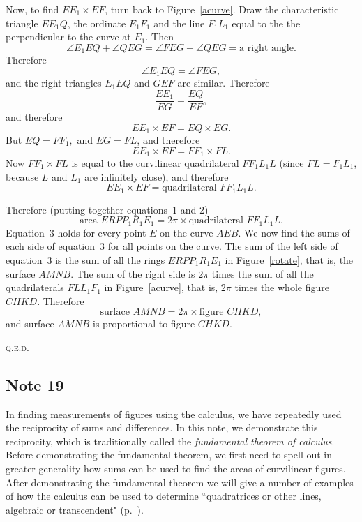 \documentclass[twoside,openright]{article}
\begin{document}
Now, to find $EE_1 \times EF$, turn back to Figure~\ref{acurve}. 
Draw
the characteristic triangle $EE_1Q$, the ordinate $E_1F_1$ and the
line $F_1L_1$ equal to the the perpendicular to the curve at $E_1$.
Then %
$$\angle E_1EQ + \angle QEG  = \angle FEG + \angle QEG = \mbox{a right angle.}$$
Therefore
$$\angle E_1EQ = \angle FEG,$$
and the right triangles $E_1EQ$ and $GEF$ are similar.  Therefore
$$\frac{EE_1}{EG} = \frac{EQ}{EF},$$
and therefore
$$EE_1\times EF = EQ \times EG.$$
But $EQ = FF_1,$ and $EG = FL$, and therefore
$$EE_1\times EF = FF_1 \times FL.$$
Now
$FF_1 \times FL$ is equal to the  curvilinear quadrilateral $FF_1L_1L$
(since $FL = F_1L_1$, because $L$ and $L_1$ are infinitely close), and therefore
\begin{equation}
EE_1\times EF = \mbox{quadrilateral }FF_1L_1L.
\end{equation}


Therefore (putting together equations~1 and 2)
\begin{equation}
\mbox{area }ERPP_1R_1E_1 = 2\pi\times \mbox{quadrilateral }FF_1L_1L.
\end{equation}
Equation~3 holds for every point $E$ on the curve $AEB$. We now find
the sums of each side of equation~3 for all points on the curve.  The
sum of the left side of equation~3 is the sum of all the rings
$ERPP_1R_1E_1$ in Figure~\ref{rotate}, that is, the surface $AMNB$.
The sum of the right side is $2\pi$ times the sum of all the
quadrilaterals $FLL_1F_1$ in Figure~\ref{acurve}, that is, $2\pi$
times the whole figure $CHKD$.  Therefore
$$\mbox{surface }AMNB = 2\pi\times \mbox{figure }CHKD,$$
and surface $AMNB$ is proportional to figure $CHKD$.

\noindent  \textsc{q.e.d.}

\subsection*{Note 19}
\label{crg19}

In finding measurements of figures using the calculus, we have
repeatedly used the reciprocity of sums and differences.  In this
note, we demonstrate this reciprocity, which is traditionally called
the {\em fundamental theorem of calculus}.  Before demonstrating the
fundamental theorem, we first need to spell out in greater generality
how sums can be used to find the areas of curvilinear figures.  After
demonstrating the fundamental theorem we will give a number of
examples of how the calculus can be used to determine ``quadratrices
or other lines, algebraic or transcendent" (p.~\pageref{quadothalg}).
\end{document}
